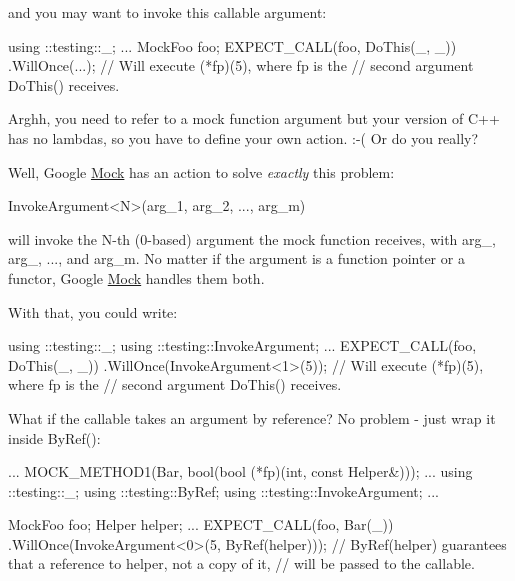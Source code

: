 and you may want to invoke this callable argument\+:


\begin{DoxyCode}
using ::testing::\_;
...
  MockFoo foo;
  EXPECT\_CALL(foo, DoThis(\_, \_))
      .WillOnce(...);
  \textcolor{comment}{// Will execute (*fp)(5), where fp is the}
  \textcolor{comment}{// second argument DoThis() receives.}
\end{DoxyCode}


Arghh, you need to refer to a mock function argument but your version of C++ has no lambdas, so you have to define your own action. \+:-\/( Or do you really?

Well, Google \hyperlink{classMock}{Mock} has an action to solve {\itshape exactly} this problem\+:


\begin{DoxyCode}
InvokeArgument<N>(arg\_1, arg\_2, ..., arg\_m)
\end{DoxyCode}


will invoke the {\ttfamily N}-\/th (0-\/based) argument the mock function receives, with {\ttfamily arg\+\_}, {\ttfamily arg\+\_}, ..., and {\ttfamily arg\+\_\+m}. No matter if the argument is a function pointer or a functor, Google \hyperlink{classMock}{Mock} handles them both.

With that, you could write\+:


\begin{DoxyCode}
using ::testing::\_;
using ::testing::InvokeArgument;
...
  EXPECT\_CALL(foo, DoThis(\_, \_))
      .WillOnce(InvokeArgument<1>(5));
  \textcolor{comment}{// Will execute (*fp)(5), where fp is the}
  \textcolor{comment}{// second argument DoThis() receives.}
\end{DoxyCode}


What if the callable takes an argument by reference? No problem -\/ just wrap it inside {\ttfamily By\+Ref()}\+:


\begin{DoxyCode}
...
  MOCK\_METHOD1(Bar, \textcolor{keywordtype}{bool}(\textcolor{keywordtype}{bool} (*fp)(\textcolor{keywordtype}{int}, \textcolor{keyword}{const} Helper&)));
...
using ::testing::\_;
using ::testing::ByRef;
using ::testing::InvokeArgument;
...

  MockFoo foo;
  Helper helper;
  ...
  EXPECT\_CALL(foo, Bar(\_))
      .WillOnce(InvokeArgument<0>(5, ByRef(helper)));
  \textcolor{comment}{// ByRef(helper) guarantees that a reference to helper, not a copy of it,}
  \textcolor{comment}{// will be passed to the callable.}
\end{DoxyCode}


